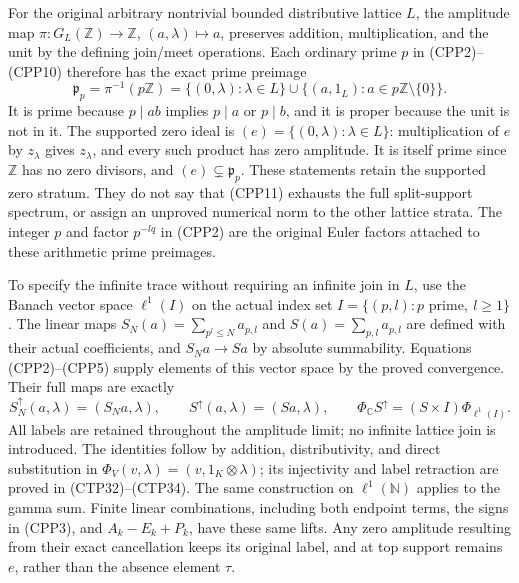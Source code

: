 For the original arbitrary nontrivial bounded distributive
lattice $L$, the amplitude map
$\pi:G_L(\mathbb Z)\to\mathbb Z$, $(a,\lambda)\mapsto a$,
preserves addition, multiplication, and the unit by the defining
join/meet operations. Each ordinary prime $p$ in (CPP2)--(CPP10)
therefore has the exact prime preimage
\begin{equation}\tag{CPP11}
 \mathfrak p_p=\pi^{-1}(p\mathbb Z)
   =\{(0,\lambda):\lambda\in L\}
      \cup\{(a,1_L):a\in p\mathbb Z\setminus\{0\}\}.
\end{equation}
It is prime because $p\mid ab$ implies $p\mid a$ or $p\mid b$,
and it is proper because the unit is not in it. The supported
zero ideal is $(e)=\{(0,\lambda):\lambda\in L\}$: multiplication
of $e$ by $z_\lambda$ gives $z_\lambda$, and every such product
has zero amplitude. It is itself prime since $\mathbb Z$ has
no zero divisors, and $(e)\subsetneq\mathfrak p_p$. These
statements retain the supported zero stratum. They do not say
that (CPP11) exhausts the full split-support spectrum, or
assign an unproved numerical norm to the other lattice strata.
The integer $p$ and factor $p^{-lq}$ in (CPP2) are the original
Euler factors attached to these arithmetic prime preimages.

To specify the infinite trace without requiring an infinite
join in $L$, use the Banach vector space $\ell^1(I)$ on the
actual index set $I=\{(p,l):p\text{ prime},\ l\ge1\}$.
The linear maps $S_N(a)=\sum_{p^l\le N}a_{p,l}$ and
$S(a)=\sum_{p,l}a_{p,l}$ are defined with their actual
coefficients, and $S_Na\to Sa$ by absolute summability.
Equations (CPP2)--(CPP5) supply elements of this vector space
by the proved convergence. Their full maps are exactly
\begin{equation}\tag{CPP12}
 S_N^\uparrow(a,\lambda)=(S_Na,\lambda),\qquad
 S^\uparrow(a,\lambda)=(Sa,\lambda),\qquad
 \Phi_{\mathbb C}S^\uparrow=(S\times I)\Phi_{\ell^1(I)}.
\end{equation}
All labels are retained throughout the amplitude limit;
no infinite lattice join is introduced. The identities follow
by addition, distributivity, and direct substitution in
$\Phi_V(v,\lambda)=(v,1_K\otimes\lambda)$; its injectivity
and label retraction are proved in (CTP32)--(CTP34).
The same construction on $\ell^1(\mathbb N)$ applies to the
gamma sum. Finite linear combinations, including both
endpoint terms, the signs in (CPP3), and $A_k-E_k+P_k$, have
these same lifts. Any zero amplitude resulting from their
exact cancellation keeps its original label, and at top
support remains $e$, rather than the absence element $\tau$.

